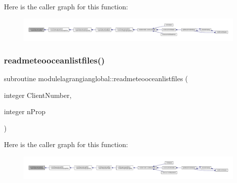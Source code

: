 Here is the caller graph for this function\+:\nopagebreak
\begin{figure}[H]
\begin{center}
\leavevmode
\includegraphics[width=350pt]{namespacemodulelagrangianglobal_aa7411b9f44061b325d38671fe7aefded_icgraph}
\end{center}
\end{figure}
\mbox{\label{namespacemodulelagrangianglobal_ae46ac0f2e57613d902f2c85755570a82}} 
\subsubsection{\texorpdfstring{readmeteooceanlistfiles()}{readmeteooceanlistfiles()}}
{\footnotesize\ttfamily subroutine modulelagrangianglobal\+::readmeteooceanlistfiles (\begin{DoxyParamCaption}\item[{integer}]{Client\+Number,  }\item[{integer}]{n\+Prop }\end{DoxyParamCaption})\hspace{0.3cm}{\ttfamily [private]}}

Here is the caller graph for this function\+:\nopagebreak
\begin{figure}[H]
\begin{center}
\leavevmode
\includegraphics[width=350pt]{namespacemodulelagrangianglobal_ae46ac0f2e57613d902f2c85755570a82_icgraph}
\end{center}
\end{figure}
\mbox{\label{namespacemodulelagrangianglobal_ae1973e5270fe0bd8fe935fa360c35bd1}} 
